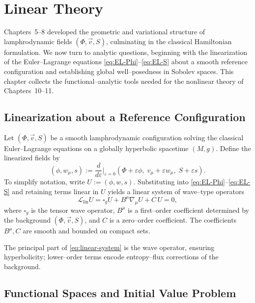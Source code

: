 \chapter{Linear Theory}
\label{ch:linear}

Chapters~5--8 developed the geometric and variational structure of
lamphrodynamic fields $(\Phi,\vec v,S)$, culminating in the classical
Hamiltonian formulation.
We now turn to analytic questions, beginning with the linearization of
the Euler--Lagrange equations \eqref{eq:EL-Phi}--\eqref{eq:EL-S} about
a smooth reference configuration and establishing global well--posedness
in Sobolev spaces.
This chapter collects the functional--analytic tools needed for the
nonlinear theory of Chapters~10--11.



\section{Linearization about a Reference Configuration}
\label{sec:linearization}

Let $(\Phi,\vec v,S)$ be a smooth lamphrodynamic configuration solving
the classical Euler--Lagrange equations on a globally hyperbolic
spacetime $(M,g)$.
Define the linearized fields by
\[
(\phi, w_{\mu}, s)
:=
\frac{d}{d\varepsilon}\big|_{\varepsilon=0}
(\Phi+\varepsilon\phi,\; v_{\mu}+\varepsilon w_{\mu},\; S+\varepsilon s).
\]
To simplify notation, write $U:=(\phi, w, s)$.
Substituting into \eqref{eq:EL-Phi}--\eqref{eq:EL-S} and retaining
terms linear in $U$ yields a linear system of wave--type operators
\begin{equation}
\label{eq:linear-system}
\mathcal{L}_{\mathrm{lin}} U
= \square_{g} U
 + B^{\mu}\nabla_{\mu}U
 + C\,U
=0,
\end{equation}
where $\square_{g}$ is the tensor wave operator, $B^{\mu}$ is a
first--order coefficient determined by the background
$(\Phi,\vec v,S)$, and $C$ is a zero--order coefficient.
The coefficients $B^{\mu},C$ are smooth and bounded on compact sets.



\begin{remark}
The principal part of \eqref{eq:linear-system} is the wave operator,
ensuring hyperbolicity; lower--order terms encode entropy--flux
corrections of the background.
\end{remark}



\section{Functional Spaces and Initial Value Problem}
\label{sec:spaces}

